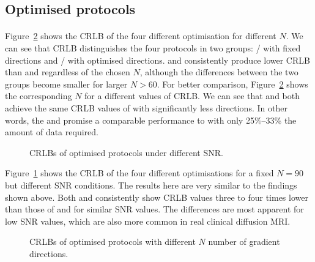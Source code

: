 \subsection{Optimised protocols}
\paragraph{}
Figure~\ref{fig:chapter7 exp1 DIRS vs CRLB} shows the CRLB of the four different optimisation for different $N$. We can see that CRLB distinguishes the four protocols in two groups: {\OI}/{\SD} with fixed directions and {\DO}/{\FD} with optimised directions. {\DO} and {\FD} consistently produce lower CRLB than {\OI} and {\SD} regardless of the chosen $N$, although the differences between the two groups become smaller for larger $N > 60$. For better comparison, Figure~\ref{fig:chapter7 exp1 DIRS vs CRLB} shows the corresponding $N$ for a different values of CRLB. We can see that {\FD} and {\DO} both achieve the same CRLB values of {\OI} with significantly less directions. In other words, the {\DO} and {\FD} promise a comparable performance to {\OI} with only 25\%--33\% the amount of data required.

\begin{figure}[H]
	\centering
	
	\caption{CRLBs of optimised protocols under different SNR.}
	\label{fig:chapter7 exp1 SNR vs CRLB}
\end{figure}

Figure~\ref{fig:chapter7 exp1 SNR vs CRLB} shows the CRLB of the four different optimisations for a fixed $N=90$ but different SNR conditions. The results here are very similar to the findings shown above. Both {\FD} and {\DO} consistently show CRLB values three to four times lower than those of {\OI} and {\SD} for similar SNR values. The differences are most apparent for low SNR values, which are also more common in real clinical diffusion MRI.
\begin{figure}[H]
	\centering
	
	\caption{CRLBs of optimised protocols with different $N$  number of gradient directions.}
	\label{fig:chapter7 exp1 DIRS vs CRLB}
\end{figure}
